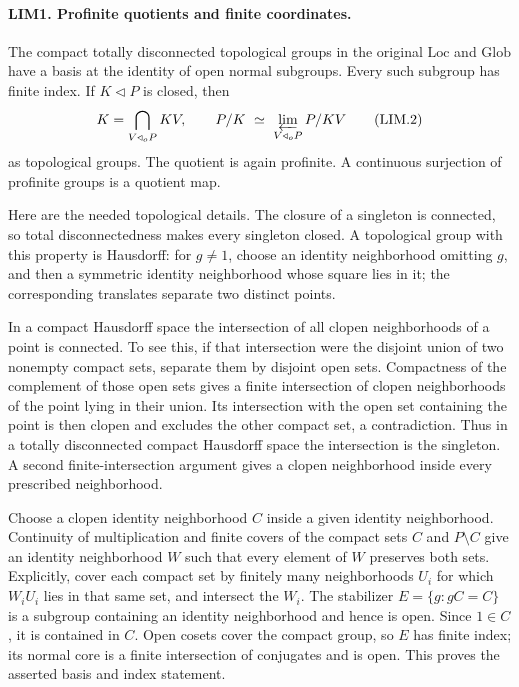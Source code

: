 \paragraph{LIM1. Profinite quotients and finite coordinates.}
\label{claim:LIM1}
The compact totally disconnected topological groups in the original
\(\mathrm{Loc}\) and \(\mathrm{Glob}\) have a basis at the identity of
open normal subgroups.  Every such subgroup has finite index.  If
\(K\triangleleft P\) is closed, then
\[
 K=\bigcap_{V\triangleleft_o P}KV,\qquad
 P/K\ \simeq\ \varprojlim_{V\triangleleft_o P} P/KV
 \tag{LIM.2}
\]
as topological groups.  The quotient is again profinite.  A continuous
surjection of profinite groups is a quotient map.

Here are the needed topological details.  The closure of a singleton is
connected, so total disconnectedness makes every singleton closed.
A topological group with this property is Hausdorff: for \(g\ne1\),
choose an identity neighborhood omitting \(g\), and then a symmetric
identity neighborhood whose square lies in it; the corresponding
translates separate two distinct points.

In a compact Hausdorff space the intersection of all clopen
neighborhoods of a point is connected.  To see this, if that intersection
were the disjoint union of two nonempty compact sets, separate them by
disjoint open sets.  Compactness of the complement of those open sets
gives a finite intersection of clopen neighborhoods of the point lying
in their union.  Its intersection with the open set containing the point
is then clopen and excludes the other compact set, a contradiction.
Thus in a totally disconnected compact Hausdorff space the intersection
is the singleton.  A second finite-intersection argument gives a clopen
neighborhood inside every prescribed neighborhood.

Choose a clopen identity neighborhood \(C\) inside a given identity
neighborhood.  Continuity of multiplication and finite covers of the
compact sets \(C\) and \(P\setminus C\) give an identity neighborhood
\(W\) such that every element of \(W\) preserves both sets.  Explicitly,
cover each compact set by finitely many neighborhoods \(U_i\) for which
\(W_iU_i\) lies in that same set, and intersect the \(W_i\).
The stabilizer \(E=\{g:gC=C\}\) is a subgroup containing an identity
neighborhood and hence is open.  Since \(1\in C\), it is contained in
\(C\).  Open cosets cover the compact group, so \(E\) has finite index;
its normal core is a finite intersection of conjugates and is open.
This proves the asserted basis and index statement.

